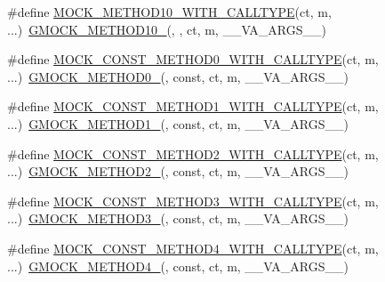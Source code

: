 \begin{DoxyCompactItemize}
\item 
\#define \mbox{\hyperlink{gmock-generated-function-mockers_8h_af9641034cbd1f178dacd3515633d951f}{M\+O\+C\+K\+\_\+\+M\+E\+T\+H\+O\+D10\+\_\+\+W\+I\+T\+H\+\_\+\+C\+A\+L\+L\+T\+Y\+PE}}(ct,  m, ...)~\mbox{\hyperlink{gmock-generated-function-mockers_8h_a81a48223a8771de36ef92ac6d56f6e81}{G\+M\+O\+C\+K\+\_\+\+M\+E\+T\+H\+O\+D10\+\_\+}}(, , ct, m, \+\_\+\+\_\+\+V\+A\+\_\+\+A\+R\+G\+S\+\_\+\+\_\+)
\item 
\#define \mbox{\hyperlink{gmock-generated-function-mockers_8h_a001804410911b4ae2bc6f02a45a467e4}{M\+O\+C\+K\+\_\+\+C\+O\+N\+S\+T\+\_\+\+M\+E\+T\+H\+O\+D0\+\_\+\+W\+I\+T\+H\+\_\+\+C\+A\+L\+L\+T\+Y\+PE}}(ct,  m, ...)~\mbox{\hyperlink{gmock-generated-function-mockers_8h_ae0d290ffa58d7c624b2e3487ba1252f4}{G\+M\+O\+C\+K\+\_\+\+M\+E\+T\+H\+O\+D0\+\_\+}}(, const, ct, m, \+\_\+\+\_\+\+V\+A\+\_\+\+A\+R\+G\+S\+\_\+\+\_\+)
\item 
\#define \mbox{\hyperlink{gmock-generated-function-mockers_8h_a94f4b0954d3d72011acf5f288ca40d42}{M\+O\+C\+K\+\_\+\+C\+O\+N\+S\+T\+\_\+\+M\+E\+T\+H\+O\+D1\+\_\+\+W\+I\+T\+H\+\_\+\+C\+A\+L\+L\+T\+Y\+PE}}(ct,  m, ...)~\mbox{\hyperlink{gmock-generated-function-mockers_8h_a1bc0012d62440dda77208dabdf4925c9}{G\+M\+O\+C\+K\+\_\+\+M\+E\+T\+H\+O\+D1\+\_\+}}(, const, ct, m, \+\_\+\+\_\+\+V\+A\+\_\+\+A\+R\+G\+S\+\_\+\+\_\+)
\item 
\#define \mbox{\hyperlink{gmock-generated-function-mockers_8h_a7c0507949996b9bae8b03fb6ea90d7a4}{M\+O\+C\+K\+\_\+\+C\+O\+N\+S\+T\+\_\+\+M\+E\+T\+H\+O\+D2\+\_\+\+W\+I\+T\+H\+\_\+\+C\+A\+L\+L\+T\+Y\+PE}}(ct,  m, ...)~\mbox{\hyperlink{gmock-generated-function-mockers_8h_a885295ca6bebb15efb3fc786218c5d47}{G\+M\+O\+C\+K\+\_\+\+M\+E\+T\+H\+O\+D2\+\_\+}}(, const, ct, m, \+\_\+\+\_\+\+V\+A\+\_\+\+A\+R\+G\+S\+\_\+\+\_\+)
\item 
\#define \mbox{\hyperlink{gmock-generated-function-mockers_8h_ac10e04e26db63b6c2a452e05d3c89db8}{M\+O\+C\+K\+\_\+\+C\+O\+N\+S\+T\+\_\+\+M\+E\+T\+H\+O\+D3\+\_\+\+W\+I\+T\+H\+\_\+\+C\+A\+L\+L\+T\+Y\+PE}}(ct,  m, ...)~\mbox{\hyperlink{gmock-generated-function-mockers_8h_af7c77ba511c631de02bb8c45a6ed3045}{G\+M\+O\+C\+K\+\_\+\+M\+E\+T\+H\+O\+D3\+\_\+}}(, const, ct, m, \+\_\+\+\_\+\+V\+A\+\_\+\+A\+R\+G\+S\+\_\+\+\_\+)
\item 
\#define \mbox{\hyperlink{gmock-generated-function-mockers_8h_a15229a3933a49f5099ee010c6dcaadeb}{M\+O\+C\+K\+\_\+\+C\+O\+N\+S\+T\+\_\+\+M\+E\+T\+H\+O\+D4\+\_\+\+W\+I\+T\+H\+\_\+\+C\+A\+L\+L\+T\+Y\+PE}}(ct,  m, ...)~\mbox{\hyperlink{gmock-generated-function-mockers_8h_ab6430f2cfad9de4aca5258ea559294bb}{G\+M\+O\+C\+K\+\_\+\+M\+E\+T\+H\+O\+D4\+\_\+}}(, const, ct, m, \+\_\+\+\_\+\+V\+A\+\_\+\+A\+R\+G\+S\+\_\+\+\_\+)

\end{DoxyCompactItemize}
